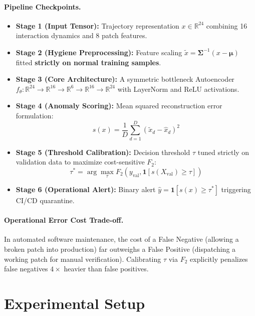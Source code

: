 \documentclass[11pt]{article}
\begin{document}
\paragraph{Pipeline Checkpoints.}
\begin{itemize}
    \item \textbf{Stage 1 (Input Tensor):} Trajectory representation $x \in \mathbb{R}^{24}$ combining 16 interaction dynamics and 8 patch features.
    \item \textbf{Stage 2 (Hygiene Preprocessing):} Feature scaling $\tilde{x} = \mathbf{\Sigma}^{-1}(x - \boldsymbol{\mu})$ fitted \textbf{strictly on normal training samples}.
    \item \textbf{Stage 3 (Core Architecture):} A symmetric bottleneck Autoencoder $f_{\theta}: \mathbb{R}^{24} \to \mathbb{R}^{16} \to \mathbb{R}^{6} \to \mathbb{R}^{16} \to \mathbb{R}^{24}$ with LayerNorm and ReLU activations.
    \item \textbf{Stage 4 (Anomaly Scoring):} Mean squared reconstruction error formulation:
    \begin{equation}
        s(x) = \frac{1}{D} \sum_{d=1}^D \left(\tilde{x}_d - \hat{x}_d\right)^2
    \end{equation}
    \item \textbf{Stage 5 (Threshold Calibration):} Decision threshold $\tau$ tuned strictly on validation data to maximize cost-sensitive $F_2$:
    \begin{equation}
        \tau^* = \arg\max_\tau F_2(y_{\text{val}}, \mathbf{1}[s(X_{\text{val}}) \ge \tau])
    \end{equation}
    \item \textbf{Stage 6 (Operational Alert):} Binary alert $\hat{y} = \mathbf{1}[s(x) \ge \tau^*]$ triggering CI/CD quarantine.
\end{itemize}

\paragraph{Operational Error Cost Trade-off.}
In automated software maintenance, the cost of a False Negative (allowing a broken patch into production) far outweighs a False Positive (dispatching a working patch for manual verification). Calibrating $\tau$ via $F_2$ explicitly penalizes false negatives $4\times$ heavier than false positives.

\section{Experimental Setup}
\end{document}
